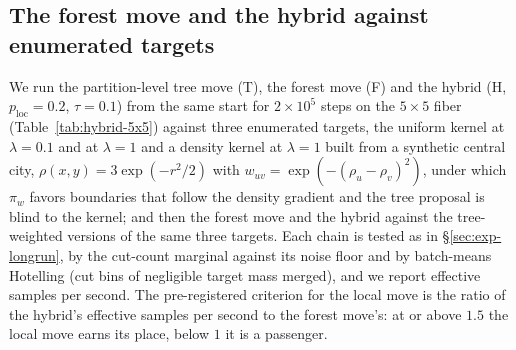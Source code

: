 \documentclass[11pt]{article}
\begin{document}
\subsection{The forest move and the hybrid against enumerated targets}\label{sec:exp-hybrid}

We run the partition-level tree move (T), the forest move (F) and
the hybrid (H, $p_{\mathrm{loc}} = 0.2$, $\tau = 0.1$) from the same
start for $2 \times 10^5$ steps on the $5 \times 5$ fiber
(Table~\ref{tab:hybrid-5x5}) against
three enumerated targets, the uniform kernel at $\lambda = 0.1$ and
at $\lambda = 1$ and a density kernel at $\lambda = 1$ built from a
synthetic central city, $\rho(x,y) = 3\exp(-r^2/2)$ with
$w_{uv} = \exp(-(\rho_u - \rho_v)^2)$, under which $\pi_w$ favors
boundaries that follow the density gradient and the tree proposal is
blind to the kernel; and then the forest move and the hybrid against
the tree-weighted versions of the same three targets. Each chain is
tested as in \S\ref{sec:exp-longrun}, by the cut-count marginal
against its noise floor and by batch-means Hotelling (cut bins of
negligible target mass merged), and we report effective samples per
second. The pre-registered criterion for the
local move is the ratio of the hybrid's effective samples per second
to the forest move's: at or above $1.5$ the local move earns its
place, below $1$ it is a passenger.
\end{document}
